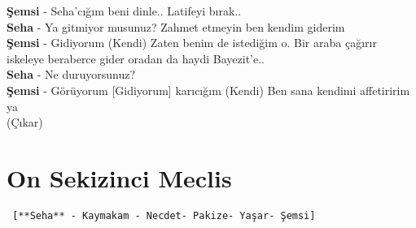 \documentclass[]{book}
\begin{document}
\textbf{Şemsi} - Seha'cığım beni dinle.. Latifeyi bırak..\\
\textbf{Seha} - Ya gitmiyor musunuz? Zahmet etmeyin ben kendim giderim\\
\textbf{Şemsi} - Gidiyorum (Kendi) Zaten benim de istediğim o. Bir araba çağırır iskeleye beraberce gider oradan da haydi Bayezit'e..\\
\textbf{Seha} - Ne duruyorsunuz?\\
\textbf{Şemsi} - Görüyorum {[}Gidiyorum{]} karıcığım (Kendi) Ben sana kendimi affetiririm ya\\
(Çıkar)

\hypertarget{on-sekizinci-meclis}{%
\section{On Sekizinci Meclis}\label{on-sekizinci-meclis}}

\begin{verbatim}
 [**Seha** - Kaymakam - Necdet- Pakize- Yaşar- Şemsi]
\end{verbatim}
\end{document}
